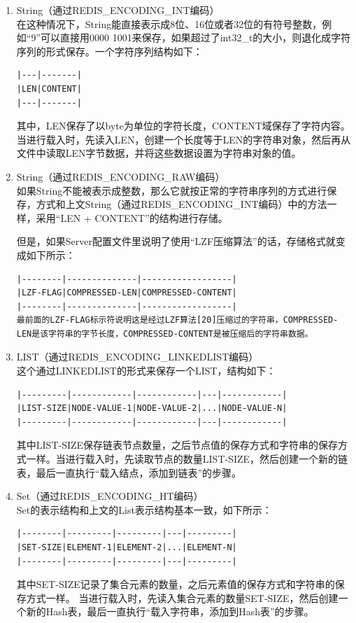 \documentclass{zjutthesis}
\begin{document}
\begin{enumerate}[label=\arabic*.]

\item{
String（通过REDIS\_ENCODING\_INT编码）\\
在这种情况下，String能直接表示成8位、16位或者32位的有符号整数，例如“9”可以直接用0000 1001来保存，如果超过了int32\_t的大小，则退化成字符序列的形式保存。一个字符序列结构如下：
\begin{verbatim}
|---|-------|
|LEN|CONTENT|
|---|-------|
\end{verbatim}
其中，LEN保存了以byte为单位的字符长度，CONTENT域保存了字符内容。
当进行载入时，先读入LEN，创建一个长度等于LEN的字符串对象，然后再从文件中读取LEN字节数据，并将这些数据设置为字符串对象的值。
}

\item{
String（通过REDIS\_ENCODING\_RAW编码）\\
如果String不能被表示成整数，那么它就按正常的字符串序列的方式进行保存，方式和上文String（通过REDIS\_ENCODING\_INT编码）中的方法一样，采用“LEN + CONTENT”的结构进行存储。

但是，如果Server配置文件里说明了使用“LZF压缩算法”的话，存储格式就变成如下所示：
\begin{verbatim}
|--------|--------------|------------------|
|LZF-FLAG|COMPRESSED-LEN|COMPRESSED-CONTENT|
|--------|--------------|------------------|
最前面的LZF-FLAG标示符说明这是经过LZF算法[20]压缩过的字符串，COMPRESSED-LEN是该字符串的字节长度，COMPRESSED-CONTENT是被压缩后的字符串数据。
\end{verbatim}
}

\item{
LIST（通过REDIS\_ENCODING\_LINKEDLIST编码）\\
这个通过LINKEDLIST的形式来保存一个LIST，结构如下：
\begin{verbatim}
|---------|------------|------------|---|------------|
|LIST-SIZE|NODE-VALUE-1|NODE-VALUE-2|...|NODE-VALUE-N|
|---------|------------|------------|---|------------|
\end{verbatim}
其中LIST-SIZE保存链表节点数量，之后节点值的保存方式和字符串的保存方式一样。当进行载入时，先读取节点的数量LIST-SIZE，然后创建一个新的链表，最后一直执行“载入结点，添加到链表”的步骤。
}

\item{
Set（通过REDIS\_ENCODING\_HT编码）\\
Set的表示结构和上文的List表示结构基本一致，如下所示：
\begin{verbatim}
|--------|---------|---------|---|---------|
|SET-SIZE|ELEMENT-1|ELEMENT-2|...|ELEMENT-N|
|--------|---------|---------|---|---------|
\end{verbatim}
其中SET-SIZE记录了集合元素的数量，之后元素值的保存方式和字符串的保存方式一样。
当进行载入时，先读入集合元素的数量SET-SIZE，然后创建一个新的Hash表，最后一直执行“载入字符串，添加到Hash表”的步骤。
}


\end{enumerate}
\end{document}
